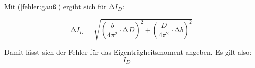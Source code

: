 Mit (\ref{fehler:gauß}) ergibt sich  für $\increment I_{D}$:

\begin{equation*}
  \increment I_{D} = \sqrt{\left(\frac{b}{4 \pi^2} \cdot  \increment D\right)^2 + \left(\frac{D}{4 \pi^2} \cdot  \increment b\right)^2}
\end{equation*}

Damit lässt sich der Fehler für das Eigenträgheitsmoment angeben. Es gilt also:
\begin{equation*}
  I_{D} = 
\end{equation*}